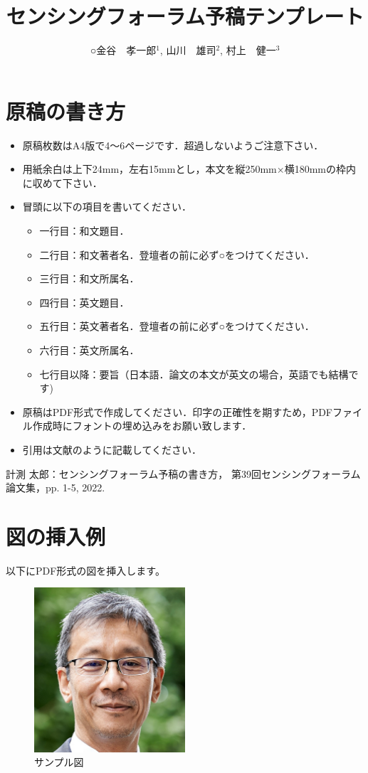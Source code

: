 \documentclass[a4paper]{jarticle}
\title{センシングフォーラム予稿テンプレート}
\author{○金谷　孝一郎$^1$, 山川　雄司$^2$, 村上　健一$^3$}
\affiliation{
$^1$ 東京大学,
$^2$ 東京大学,
$^3$ 東京大学 }
\begin{document}
\maketitle
\iffalse
\section{原稿の書き方}
\begin{itemize}
\item 原稿枚数はA4版で4～6ページです．超過しないようご注意下さい．
\item 用紙余白は上下24mm，左右15mmとし，本文を縦250mm×横180mmの枠内に収めて下さい．
\item 冒頭に以下の項目を書いてください．
\begin{itemize}
\item 一行目：和文題目．
\item 二行目：和文著者名．登壇者の前に必ず○をつけてください．
\item 三行目：和文所属名．
\item 四行目：英文題目．
\item 五行目：英文著者名．登壇者の前に必ず○をつけてください．
\item 六行目：英文所属名．
\item 七行目以降：要旨（日本語．論文の本文が英文の場合，英語でも結構です)
\end{itemize}
\item 原稿はPDF形式で作成してください．印字の正確性を期すため，PDFファイル作成時にフォントの埋め込みをお願い致します．
\item 引用は文献\cite{ref1}のように記載してください．
\end{itemize}
\begin{thebibliography}{9}
計測 太郎：センシングフォーラム予稿の書き方，
第39回センシングフォーラム論文集，pp. 1-5, 2022.
\end{thebibliography}
\section{図の挿入例}
以下にPDF形式の図を挿入します。

\begin{figure}[htbp]
    \centering
    \includegraphics[width=0.5\textwidth]{example.pdf}
    \caption{サンプル図}
    \label{fig:sample}
\end{figure}
\end{document}
